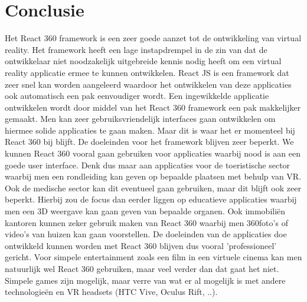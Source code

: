 
\chapter{Conclusie}
\label{ch:conclusie}


Het React 360 framework is een zeer goede aanzet tot de ontwikkeling van virtual reality. Het framework heeft een lage instapdrempel in de zin van dat de ontwikkelaar niet noodzakelijk uitgebreide kennis nodig heeft om een virtual reality applicatie ermee te kunnen ontwikkelen. React JS is een framework dat zeer snel kan worden aangeleerd waardoor het ontwikkelen van deze applicaties ook automatisch een pak eenvoudiger wordt. Een ingewikkelde applicatie ontwikkelen wordt door middel van het React 360 framework een pak makkelijker gemaakt. Men kan zeer gebruiksvriendelijk interfaces gaan ontwikkelen om hiermee solide applicaties te gaan maken. Maar dit is waar het er momenteel bij React 360 bij blijft. De doeleinden voor het framework blijven zeer beperkt. We kunnen React 360 vooral gaan gebruiken voor applicaties waarbij nood is aan een goede user interface. Denk dus maar aan applicaties voor de toeristische sector waarbij men een rondleiding kan geven op bepaalde plaatsen met behulp van VR. Ook de medische sector kan dit eventueel gaan gebruiken, maar dit blijft ook zeer beperkt. Hierbij zou de focus dan eerder liggen op educatieve applicaties waarbij men een 3D weergave kan gaan geven van bepaalde organen. Ook immobiliën kantoren kunnen zeker gebruik maken van React 360 waarbij men 360\textdegree foto's of video's van huizen kan gaan voorstellen. De doeleinden van de applicaties doe ontwikkeld kunnen worden met React 360 blijven dus vooral 'professioneel' gericht. Voor simpele entertainment zoals een film in een virtuele cinema kan men natuurlijk wel React 360 gebruiken, maar veel verder dan dat gaat het niet. Simpele games zijn mogelijk, maar verre van wat er al mogelijk is met andere technologieën en VR headsets (HTC Vive, Oculus Rift, ..). 

